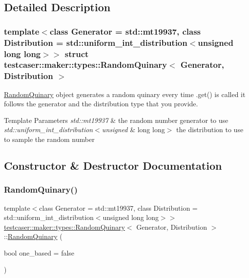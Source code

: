 \subsection{Detailed Description}
\subsubsection*{template$<$class Generator = std\+::mt19937, class Distribution = std\+::uniform\+\_\+int\+\_\+distribution$<$unsigned long long$>$$>$\newline
struct testcaser\+::maker\+::types\+::\+Random\+Quinary$<$ Generator, Distribution $>$}

\hyperlink{structtestcaser_1_1maker_1_1types_1_1RandomQuinary}{Random\+Quinary} object generates a random quinary every time .get() is called it follows the generator and the distribution type that you provide. 


\begin{DoxyTemplParams}{Template Parameters}
{\em std\+::mt19937} & the random number generator to use \\
\hline
{\em std\+::uniform\+\_\+int\+\_\+distribution$<$unsigned} & long long$>$ the distribution to use to sample the random number \\
\hline
\end{DoxyTemplParams}


\subsection{Constructor \& Destructor Documentation}
\mbox{\label{structtestcaser_1_1maker_1_1types_1_1RandomQuinary_ab90bbc3ae63d86dc16de138f9a5a1508}} 
\subsubsection{\texorpdfstring{Random\+Quinary()}{RandomQuinary()}}
{\footnotesize\ttfamily template$<$class Generator = std\+::mt19937, class Distribution = std\+::uniform\+\_\+int\+\_\+distribution$<$unsigned long long$>$$>$ \\
\hyperlink{structtestcaser_1_1maker_1_1types_1_1RandomQuinary}{testcaser\+::maker\+::types\+::\+Random\+Quinary}$<$ Generator, Distribution $>$\+::\hyperlink{structtestcaser_1_1maker_1_1types_1_1RandomQuinary}{Random\+Quinary} (\begin{DoxyParamCaption}\item[{bool}]{one\+\_\+based = {\ttfamily false} }\end{DoxyParamCaption})\hspace{0.3cm}{\ttfamily [inline]}}



